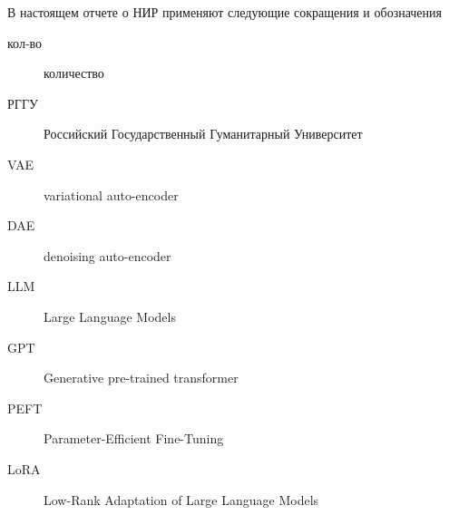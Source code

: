 \Abbreviations %
В настоящем отчете о НИР применяют следующие сокращения и обозначения

\begin{description}
\item[кол-во] количество
\item[РГГУ] Российский Государственный Гуманитарный Университет
\item[VAE] variational auto-encoder
\item[DAE] denoising auto-encoder
\item[LLM] Large Language Models
\item[GPT] Generative pre-trained transformer
\item[PEFT] Parameter-Efficient Fine-Tuning
\item[LoRA] Low-Rank Adaptation of Large Language Models

\end{description}
